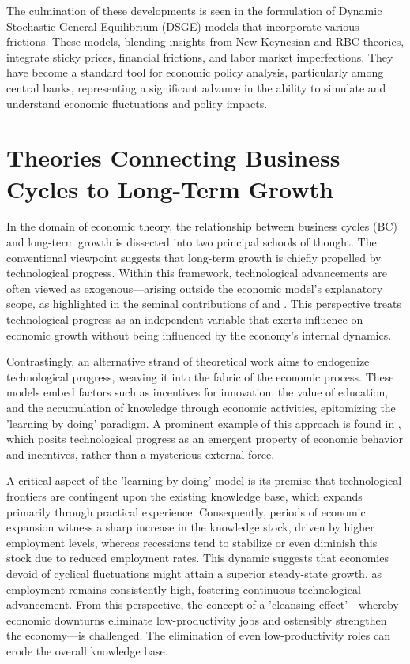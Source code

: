 \documentclass[12pt]{article}
\begin{document}
The culmination of these developments is seen in the formulation of Dynamic Stochastic General Equilibrium (DSGE) models
that incorporate various frictions. These models, blending insights from New Keynesian and RBC theories, integrate
sticky prices, financial frictions, and labor market imperfections. They have become a standard tool for economic policy
analysis, particularly among central banks, representing a significant advance in the ability to simulate and understand
economic fluctuations and policy impacts. 

\section{Theories Connecting Business Cycles to Long-Term Growth}

In the domain of economic theory, the relationship between business cycles (BC) and long-term growth is dissected into
two principal schools of thought. The conventional viewpoint suggests that long-term growth is chiefly propelled by
technological progress. Within this framework, technological advancements are often viewed as exogenous—arising outside
the economic model's explanatory scope, as highlighted in the seminal contributions of \cite{Sol56} and \cite{Swa56}.
This perspective treats technological progress as an independent variable that exerts influence on economic growth
without being influenced by the economy's internal dynamics. 

Contrastingly, an alternative strand of theoretical work aims to endogenize technological progress, weaving it into the
fabric of the economic process. These models embed factors such as incentives for innovation, the value of education,
and the accumulation of knowledge through economic activities, epitomizing the 'learning by doing' paradigm. A prominent
example of this approach is found in \cite{Sta90}, which posits technological progress as an emergent property of
economic behavior and incentives, rather than a mysterious external force. 

A critical aspect of the 'learning by doing' model is its premise that technological frontiers are contingent upon the
existing knowledge base, which expands primarily through practical experience. Consequently, periods of economic
expansion witness a sharp increase in the knowledge stock, driven by higher employment levels, whereas recessions tend
to stabilize or even diminish this stock due to reduced employment rates. This dynamic suggests that economies devoid of
cyclical fluctuations might attain a superior steady-state growth, as employment remains consistently high, fostering
continuous technological advancement. From this perspective, the concept of a 'cleansing effect'—whereby economic
downturns eliminate low-productivity jobs and ostensibly strengthen the economy—is challenged. The elimination of even
low-productivity roles can erode the overall knowledge base. 
\end{document}
